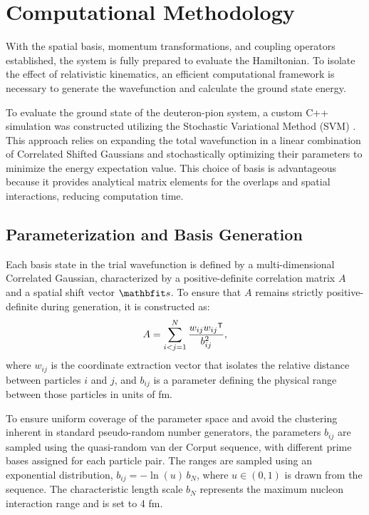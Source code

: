 \documentclass[a4paper,oneside,article,12pt]{memoir}
\begin{document}
\newpage
\chapter{Computational Methodology} \label{ch:comp}
With the spatial basis, momentum transformations, and coupling operators established, the system is fully prepared to evaluate the Hamiltonian. To isolate the effect of relativistic kinematics, an efficient computational framework is necessary to generate the wavefunction and calculate the ground state energy.

To evaluate the ground state of the deuteron-pion system, a custom C++ simulation was constructed utilizing the Stochastic Variational Method (SVM) \cite{SVM}. This approach relies on expanding the total wavefunction in a linear combination of Correlated Shifted Gaussians and stochastically optimizing their parameters to minimize the energy expectation value. This choice of basis is advantageous because it provides analytical matrix elements for the overlaps and spatial interactions, reducing computation time. 

\section{Parameterization and Basis Generation}
Each basis state in the trial wavefunction is defined by a multi-dimensional Correlated Gaussian, characterized by a positive-definite correlation matrix $A$ and a spatial shift vector $\v{s}$. To ensure that $A$ remains strictly positive-definite during generation, it is constructed as:
\begin{align}
    A = \sum_{i<j=1}^{N} \frac{w_{ij} w_{ij}\tr }{b_{ij}^2},
\end{align}
where $w_{ij}$ is the coordinate extraction vector that isolates the relative distance between particles $i$ and $j$, and $b_{ij}$ is a parameter defining the physical range between those particles in units of fm. 

To ensure uniform coverage of the parameter space and avoid the clustering inherent in standard pseudo-random number generators, the parameters $b_{ij}$ are sampled using the quasi-random van der Corput sequence, with different prime bases assigned for each particle pair. The ranges are sampled using an exponential distribution, $b_{ij} = -\ln(u) \, b_N$, where $u \in (0,1)$ is drawn from the sequence. The characteristic length scale $b_N$ represents the maximum nucleon interaction range and is set to 4 fm. 
\end{document}
